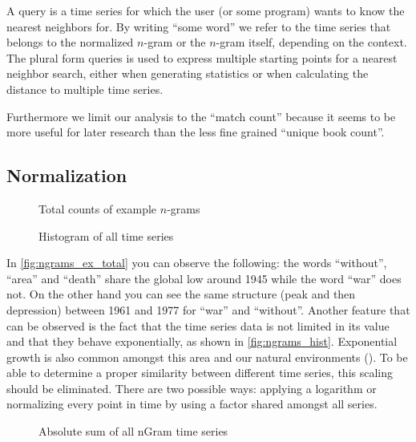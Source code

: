 \begin{definition}[Query]
    A query is a time series for which the user (or some program) wants to know the nearest neighbors for. By writing \enquote{some word} we refer to the time series that belongs to the normalized $n$-gram or the $n$-gram itself, depending on the context. The plural form queries is used to express multiple starting points for a nearest neighbor search, either when generating statistics or when calculating the distance to multiple time series.
\end{definition}

Furthermore we limit our analysis to the \enquote{match count} because it seems to be more useful for later research than the less fine grained \enquote{unique book count}.


\subsection{Normalization}
\label{ssec:baseline:sim:norm}

\begin{figure}
    \centering
    
    \caption{Total counts of example $n$-grams}\label{fig:ngrams_ex_total}
\end{figure}

\begin{figure}
    \centering
    
    \caption{Histogram of all time series}\label{fig:ngrams_hist}
\end{figure}

In \autoref{fig:ngrams_ex_total} you can observe the following: the words \enquote{without}, \enquote{area} and \enquote{death} share the global low around 1945 while the word \enquote{war} does not. On the other hand you can see the same structure (peak and then depression) between 1961 and 1977 for \enquote{war} and \enquote{without}. Another feature that can be observed is the fact that the time series data is not limited in its value and that they behave exponentially, as shown in \autoref{fig:ngrams_hist}. Exponential growth is also common amongst this area and our natural environments (\cite{exp_growth1,exp_growth2}). To be able to determine a proper similarity between different time series, this scaling should be eliminated. There are two possible ways: applying a logarithm or normalizing every point in time by using a factor shared amongst all series.

\begin{figure}
    \centering
    
    \caption{Absolute sum of all nGram time series}\label{fig:ngrams_sums}
\end{figure}

